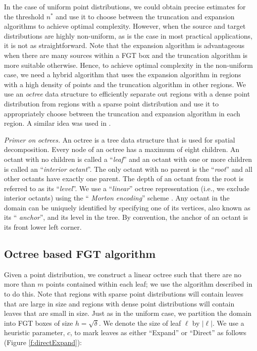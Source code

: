 
 In the case of uniform point distributions, we could obtain precise estimates for the threshold $n^*$ and use it to 
 choose between the truncation and expansion algorithms to achieve optimal complexity. However, when the source and 
 target distributions are highly non-uniform, as is the case in most practical applications, it is not as
 straightforward. Note that the expansion algorithm is advantageous when there are many sources within a FGT box and
 the truncation algorithm is more suitable otherwise. Hence, to achieve optimal complexity in the non-uniform case, we 
 need a hybrid algorithm that uses the expansion algorithm in regions with a high density of points and the 
 truncation algorithm in other regions. We use an {\em octree} \cite{clr90} data structure to efficiently
 separate out regions with a dense point distribution from regions with a sparse point distribution and use
 it to appropriately choose between the truncation and expansion algorithm in each region. A similar idea was
 used in \cite{veerapaneni08}.  
 
{\em Primer on octrees.} An octree is a tree data structure that is used for spatial decomposition. Every
node of an octree has a maximum of eight children. An octant with no children is
called a ``{\em leaf}'' and an octant with one or more children is
called an ``{\em interior octant}''. The only octant with no parent is the
 ``{\em root}'' and all other octants have exactly one parent. The depth of an octant 
 from the root is referred to as its ``{\em level}''. We use a ``{\em linear}'' octree
representation (i.e., we exclude interior octants) using the ``{\em
Morton encoding}'' scheme \cite{morton66}. Any octant in the domain can be uniquely
identified by specifying one of its vertices, also known as its ``{\em
anchor}'', and its level in the tree. By convention, the anchor of an
octant is its front lower left corner. 

\subsection{Octree based FGT algorithm}
\label{sc:octreefgt}

 Given a point distribution, we construct a linear octree such that there are no more than $m$ points contained within each leaf; we
 use the algorithm described in \cite{octPaper08} to do this. Note that regions with sparse point distributions will contain 
 leaves that are large in size and regions with dense point distributions will contain leaves that are small in size. Just as in 
 the uniform case, we partition the domain into FGT boxes of size $h = \sqrt{\delta}$. We denote the size of leaf $\ell$ by $|\ell|$.
 We use a heuristic parameter, $c$, to mark leaves as either ``Expand'' or ``Direct'' as follows (Figure \ref{f:directExpand}):

